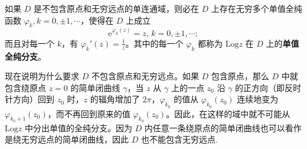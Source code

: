 \documentclass[../../main.tex]{subfiles}
\begin{document}
\begin{theorem}\label{theorem:单值全纯分支}
如果 \( D \) 是不包含原点和无穷远点的单连通域，则必在 \( D \) 上存在无穷多个单值全纯函数 \( \varphi_k, k = 0, \pm 1, \cdots \)，使得在 \( D \) 上成立
\[
\mathrm{e}^{\varphi_k(z)} = z, \, k = 0, \pm 1, \cdots;
\]
而且对每一个 \( k \)，有 \( \varphi_k'(z) = \frac{1}{z} \)。其中的每一个 \( \varphi_k \) 都称为 \( \mathrm{Log} z \) 在 \( D \) 上的\textbf{单值全纯分支}。
\end{theorem}
\begin{remark}
现在说明为什么要求 \( D \) 不包含原点和无穷远点。如果 \( D \) 包含原点，那么 \( D \) 中就包含绕原点 \( z = 0 \) 的简单闭曲线 \( \gamma \)，当 \( z \) 从 \( \gamma \) 上的一点 \( z_0 \) 沿 \( \gamma \) 的正方向（即反时针方向）回到 \( z_0 \) 时，\( z \) 的辐角增加了 \( 2\pi \)，\( \varphi_{k_0} \) 的值从 \( \varphi_{k_0}(z_0) \) 连续地变为 \( \varphi_{k_0 + 1}(z_0) \)，而不再回到原来的值 \( \varphi_{k_0}(z_0) \)。因此，在这样的域中就不可能从 \( \mathrm{Log} z \) 中分出单值的全纯分支。因为 \( D \) 内任意一条绕原点的简单闭曲线也可以看作是绕无穷远点的简单闭曲线，因此 \( D \) 也不能包含无穷远点.
\end{remark}
\end{document}
